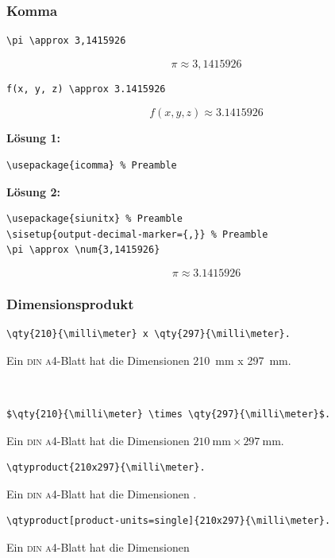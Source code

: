 \documentclass{beamer}
\begin{document}
\begin{frame}[fragile]
    \frametitle{Komma}
    \begin{wrong}
        \begin{lstlisting}
\pi \approx 3,1415926
        \end{lstlisting}
        \begin{equation*}
            \pi \approx 3,1415926
        \end{equation*}
    \end{wrong}
    \pause
    \begin{lstlisting}
f(x, y, z) \approx 3.1415926
    \end{lstlisting}
    \begin{equation*}
        f(x,y,z) \approx 3.1415926
    \end{equation*}

    \pause

    \textbf{Lösung 1:}
    \begin{lstlisting}
\usepackage{icomma} % Preamble
    \end{lstlisting}

    \pause

    \textbf{Lösung 2:}
    \begin{lstlisting}
\usepackage{siunitx} % Preamble
\sisetup{output-decimal-marker={,}} % Preamble
\pi \approx \num{3,1415926}
    \end{lstlisting}
    \begin{equation*}
        \pi \approx \num[output-decimal-marker={,}]{3,1415926}
    \end{equation*}
\end{frame}

\begin{frame}[fragile]
    \frametitle{Dimensionsprodukt}
    \begin{wrong}
        \begin{lstlisting}
\qty{210}{\milli\meter} x \qty{297}{\milli\meter}.
        \end{lstlisting}
        Ein \textsc{din a4}-Blatt hat die Dimensionen \qty{210}{\milli\meter} x \qty{297}{\milli\meter}.
    \end{wrong}\\[2ex]
    \pause

    \begin{lstlisting}
$\qty{210}{\milli\meter} \times \qty{297}{\milli\meter}$.
    \end{lstlisting}
    Ein \textsc{din a4}-Blatt hat die Dimensionen $\qty{210}{\milli\meter} \times \qty{297}{\milli\meter}$.\\[2ex]
    \pause

    \begin{lstlisting}
\qtyproduct{210x297}{\milli\meter}.
    \end{lstlisting}
    Ein \textsc{din a4}-Blatt hat die Dimensionen .

    \begin{lstlisting}
\qtyproduct[product-units=single]{210x297}{\milli\meter}.
    \end{lstlisting}
    Ein \textsc{din a4}-Blatt hat die Dimensionen 
\end{frame}
\end{document}
